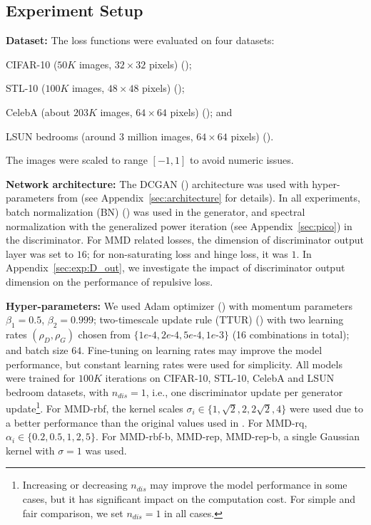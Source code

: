 \documentclass{article} %
\theoremstyle{plain}
\newtheorem*{proposition 1*}{Proposition 1}
\begin{document}
\subsection{Experiment Setup}
\label{sec:exp:setup}

\textbf{Dataset:} The loss functions were evaluated on four datasets: 
\begin{enumerate*}[label=\arabic*)]
	\item CIFAR-10 (\(50K\) images, \(32\times32\) pixels) (\cite{cifar10});
	\item STL-10 (\(100K\) images, \(48\times48\) pixels) (\cite{stl10});
	\item CelebA (about \(203K\) images, \(64\times64\) pixels) (\cite{celeba}); and
	\item LSUN bedrooms (around \(3\) million images, \(64\times64\) pixels) (\cite{lsun}).
\end{enumerate*}
The images were scaled to range \([-1,1]\) to avoid numeric issues.

\textbf{Network architecture:} The DCGAN (\cite{dcgan}) architecture was used with hyper-parameters from \cite{spectral} (see Appendix~\ref{sec:architecture} for details). In all experiments, batch normalization (BN) (\cite{batchnorm}) was used in the generator, and spectral normalization with the generalized power iteration (see Appendix~\ref{sec:pico}) in the discriminator. For MMD related losses, the dimension of discriminator output layer was set to \(16\); for non-saturating loss and hinge loss, it was \(1\). In Appendix~\ref{sec:exp:D_out}, we investigate the impact of discriminator output dimension on the performance of repulsive loss.

\textbf{Hyper-parameters:} We used Adam optimizer (\cite{adam}) with momentum parameters \(\beta_1=0.5\), \(\beta_2=0.999\); two-timescale update rule (TTUR) (\cite{ttur}) with two learning rates \((\rho_D,\rho_G)\) chosen from \(\{1e\text{-}4, 2e\text{-}4, 5e\text{-}4, 1e\text{-}3\}\) (16 combinations in total); and batch size \(64\). Fine-tuning on learning rates may improve the model performance, but constant learning rates were used for simplicity. All models were trained for \(100K\) iterations on CIFAR-10, STL-10, CelebA and LSUN bedroom datasets, with \(n_{dis}=1\), i.e., one discriminator update per generator update\footnote{Increasing or decreasing \(n_{dis}\) may improve the model performance in some cases, but it has significant impact on the computation cost. For simple and fair comparison, we set \(n_{dis}=1\) in all cases.}. For MMD-rbf, the kernel scales \(\sigma_{i}\in\{1,\sqrt{2},2,2\sqrt{2},4\}\) were used due to a better performance than the original values used in \cite{mmd_gan_g}. For MMD-rq, \(\alpha_{i}\in\{0.2,0.5,1,2,5\}\). For MMD-rbf-b, MMD-rep, MMD-rep-b, a single Gaussian kernel with \(\sigma=1\) was used.
\end{document}
